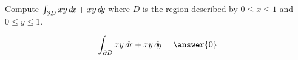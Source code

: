 \documentclass{ximera}
\author{David Guichard \and Neal Koblitz \and H. Jerome Keisler \and Albert Scheller \and Barry Balof \and Mike Wills \and Matthew Carr}
\begin{document}
\begin{exercise}




Compute $\int_{\partial D}xy\mathop{}\!d\! x+xy\mathop{}\!d\! y$ where $D$ is the region described by $0\le x\le 1$ and $0\le y\le 1$. 
 

\begin{prompt}
\[
\int_{\partial D}xy\d x+xy\d y=\answer{0}
\]
\end{prompt}

\end{exercise}
\end{document}
